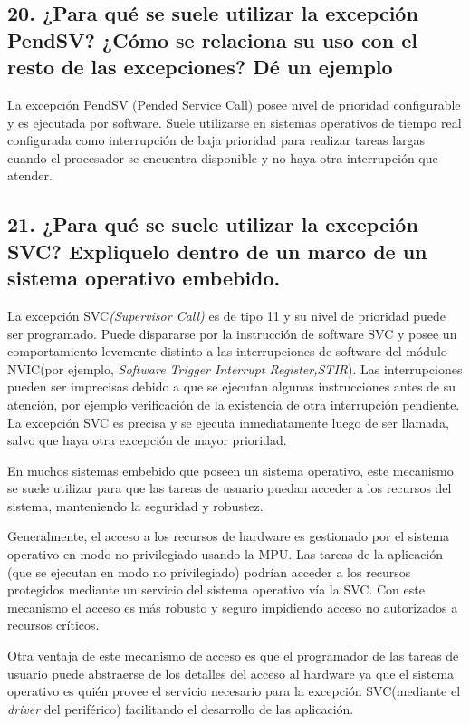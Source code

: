 \documentclass[10pt,a4paper,twoside,spanish]{article}	%
\begin{document}
\subsection*{20. ¿Para qué se suele utilizar la excepción PendSV? ¿Cómo se relaciona su uso con el resto de las excepciones? Dé un ejemplo}

La excepción  PendSV (Pended Service Call) posee nivel de prioridad configurable y es ejecutada por software. Suele utilizarse en sistemas operativos de tiempo real configurada como interrupción de baja prioridad para realizar tareas largas cuando el procesador se encuentra disponible y no haya otra interrupción que atender.


\subsection*{21. ¿Para qué se suele utilizar la excepción SVC? Expliquelo dentro de un marco de un sistema operativo embebido.}

La excepción SVC\textit{(Supervisor Call)} es de tipo 11 y su nivel de prioridad puede ser programado. Puede dispararse por la instrucción de software SVC y posee un comportamiento levemente distinto a las interrupciones de software del módulo NVIC(por ejemplo, \textit{Software Trigger Interrupt Register,STIR}). Las interrupciones pueden ser imprecisas debido a que se ejecutan algunas instrucciones antes de su atención, por ejemplo verificación de la existencia de otra interrupción pendiente. La excepción SVC es precisa y se ejecuta inmediatamente luego de ser llamada, salvo que haya otra excepción de mayor prioridad.

En muchos sistemas embebido que poseen un sistema operativo, este mecanismo se suele utilizar para que las tareas de usuario puedan acceder a los recursos del sistema, manteniendo la seguridad y robustez.

Generalmente, el acceso a los recursos de hardware es gestionado por el sistema operativo en modo no privilegiado usando la MPU. Las tareas de la aplicación (que se ejecutan en modo no privilegiado) podrían acceder a los recursos protegidos mediante un servicio del sistema operativo vía la SVC. Con este mecanismo el acceso es más robusto y seguro impidiendo acceso no autorizados a recursos críticos.  


Otra ventaja de este mecanismo de acceso es que el programador de las tareas de usuario puede abstraerse de los detalles del acceso al hardware ya que el sistema operativo es quién provee el servicio necesario para la excepción SVC(mediante el \textit{driver} del periférico) facilitando el desarrollo de las aplicación.
\end{document}

